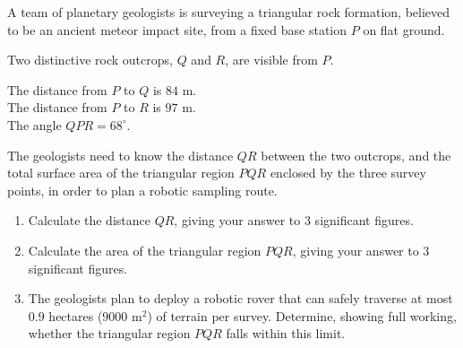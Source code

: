 \begin{question}
\noindent A team of planetary geologists is surveying a triangular rock formation, believed to be an ancient meteor impact site, from a fixed base station $P$ on flat ground.

Two distinctive rock outcrops, $Q$ and $R$, are visible from $P$.

The distance from $P$ to $Q$ is $84$ m.\\
The distance from $P$ to $R$ is $97$ m.\\
The angle $QPR = 68^{\circ}$.

\begin{center}
\end{center}

\noindent The geologists need to know the distance $QR$ between the two outcrops, and the total surface area of the triangular region $PQR$ enclosed by the three survey points, in order to plan a robotic sampling route.

\begin{enumerate}
    \item[(a)] Calculate the distance $QR$, giving your answer to 3 significant figures.

    \vspace{5cm}

    \item[(b)] Calculate the area of the triangular region $PQR$, giving your answer to 3 significant figures.

    \vspace{4cm}

    \item[(c)] The geologists plan to deploy a robotic rover that can safely traverse at most $0.9$ hectares ($9000$ m$^2$) of terrain per survey. Determine, showing full working, whether the triangular region $PQR$ falls within this limit.

    \vspace{4cm}
\end{enumerate}

\begin{flushright}
\end{flushright}
\end{question}
